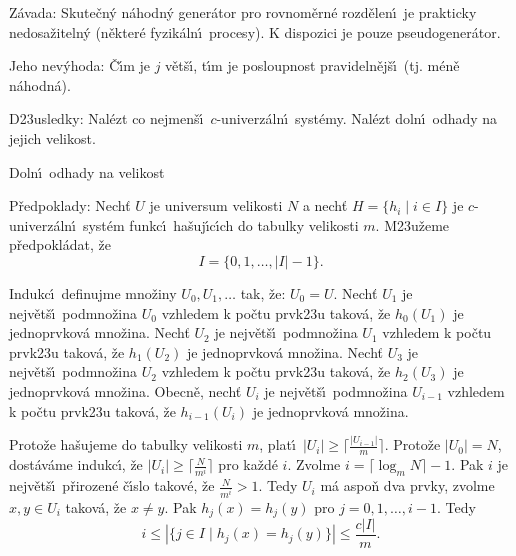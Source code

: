 \flushpar Z\'avada: Skute\v cn\'y n\'ahodn\'y gener\'ator pro 
rovnom\v ern\'e rozd\v ele\-n\'\i\ je prakticky nedosa\v ziteln\'y 
(n\v ekter\'e fyzik\'aln\'\i\ procesy). K dispozici je pouze 
pseudogener\'ator. 
\medskip

\flushpar Jeho nev\'yhoda: \v C\'\i m je $j$ v\v et\v s\'\i , t\'\i m je 
posloupnost pravideln\v ej\v s\'\i\ (tj. m\'en\v e n\'ahodn\'a). 
\medskip

\flushpar D\accent23usledky: Nal\'ezt co nejmen\v s\'\i\ $c$-univerz\'aln\'\i\ 
syst\'emy. Nal\'ezt doln\'\i\ odhady na jejich velikost.
\medskip

\subhead
Doln\'\i\ odhady na velikost
\endsubhead
\smallskip

\flushpar P\v redpoklady: Nech\v t $U$ je universum velikosti $N$ a nech\v t 
$H=\{h_i\mid i\in I\}$ je $c$-univerz\'aln\'\i\ syst\'em funkc\'\i\ ha\v suj\'\i c\'\i ch do tabulky velikosti 
$m$. M\accent23u\v zeme p\v redpokl\'a\-dat, \v ze $$I=\{0,1,\dots
,|I|-1\}.$$
\medskip

\flushpar Indukc\'\i\ definujme mno\v ziny $U_0,U_1,\dots$ tak, \v ze: 
$U_0=U$.\newline 
Nech\v t $U_1$ je nejv\v et\v s\'\i\ podmno\v zina $U_0$ vzhledem k po\v ctu 
prvk\accent23u takov\'a, \v ze $h_0(U_1)$ je jednoprvkov\'a 
mno\v zina. \newline 
Nech\v t $U_2$ je nejv\v et\v s\'\i\ podmno\v zina $U_1$ vzhledem k po\v ctu 
prvk\accent23u takov\'a, \v ze $h_1(U_2)$ je jednoprvkov\'a 
mno\v zina. \newline 
Nech\v t $U_3$ je nejv\v et\v s\'\i\ podmno\v zina $U_2$ vzhledem k po\v ctu 
prvk\accent23u takov\'a, \v ze $h_2(U_3)$ je jednoprvkov\'a 
mno\v zina. \newline 
Obecn\v e, nech\v t $U_i$ je nejv\v et\v s\'\i\ podmno\v zina $U_{
i-1}$ vzhledem k po\v ctu 
prvk\accent23u takov\'a, \v ze $h_{i-1}(U_i)$ je jednoprvkov\'a 
mno\v zina. 
\medskip

\flushpar Proto\v ze ha\v sujeme do tabulky velikosti $m$, plat\'\i\ 
$|U_i|\ge\lceil\frac {|U_{i-1}|}m\rceil$. Proto\v ze $|U_0|=N$, dost\'av\'ame indukc\'\i , \v ze 
$|U_i|\ge\lceil\frac N{m^i}\rceil$ pro ka\v zd\'e $i$. Zvolme $i=
\lceil\log_mN\rceil -1$. Pak $i$ je 
nejv\v et\v s\'\i\ p\v rirozen\'e \v c\'\i slo takov\'e, \v ze $\frac 
N{m^i}>1$. Tedy $U_i$ m\'a 
aspo\v n dva prvky, zvolme $x,y\in U_i$ takov\'a, \v ze $x\ne y$. Pak 
$h_j(x)=h_j(y)$ pro $j=0,1,\dots,i-1$. Tedy 
$$i\le |\{j\in I\mid h_j(x)=h_j(y)\}|\le\frac {c|I|}m.$$
\medskip

